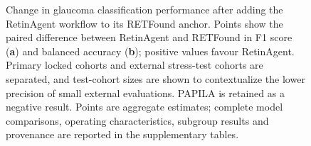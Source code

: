 \begin{figure}[t]
  \centering
  
  \caption{Change in glaucoma classification performance after adding the
  RetinAgent workflow to its RETFound anchor. Points show the paired difference
  between RetinAgent and RETFound in F1 score (\textbf{a}) and balanced accuracy
  (\textbf{b}); positive values favour RetinAgent. Primary locked cohorts and
  external stress-test cohorts are separated, and test-cohort sizes are shown to
  contextualize the lower precision of small external evaluations. PAPILA is
  retained as a negative result. Points are aggregate estimates; complete model
  comparisons, operating characteristics, subgroup results and provenance are
  reported in the supplementary tables.}
  \label{fig:glaucoma-benchmark-overview}
\end{figure}
